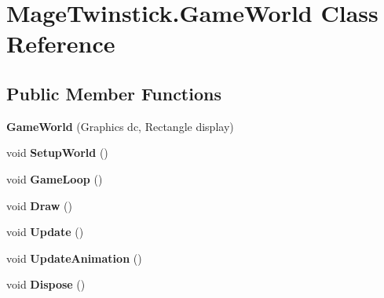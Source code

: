 \hypertarget{class_mage_twinstick_1_1_game_world}{}\section{Mage\+Twinstick.\+Game\+World Class Reference}
\label{class_mage_twinstick_1_1_game_world}
\subsection*{Public Member Functions}
\begin{DoxyCompactItemize}
\item 
\hypertarget{class_mage_twinstick_1_1_game_world_a270f04b1de26513f7893e361303fb129}{}{\bfseries Game\+World} (Graphics dc, Rectangle display)\label{class_mage_twinstick_1_1_game_world_a270f04b1de26513f7893e361303fb129}

\item 
\hypertarget{class_mage_twinstick_1_1_game_world_adb5bdbb96b081dfc7e2ed7a9b2acfa10}{}void {\bfseries Setup\+World} ()\label{class_mage_twinstick_1_1_game_world_adb5bdbb96b081dfc7e2ed7a9b2acfa10}

\item 
\hypertarget{class_mage_twinstick_1_1_game_world_a7a03f6b9f40b1e3e9aed96a614caf5e3}{}void {\bfseries Game\+Loop} ()\label{class_mage_twinstick_1_1_game_world_a7a03f6b9f40b1e3e9aed96a614caf5e3}

\item 
\hypertarget{class_mage_twinstick_1_1_game_world_aad92b4d3c95491f04ac4885d96c15c3c}{}void {\bfseries Draw} ()\label{class_mage_twinstick_1_1_game_world_aad92b4d3c95491f04ac4885d96c15c3c}

\item 
\hypertarget{class_mage_twinstick_1_1_game_world_a3912f8f9ec0acd789eb46e1abcfcf2de}{}void {\bfseries Update} ()\label{class_mage_twinstick_1_1_game_world_a3912f8f9ec0acd789eb46e1abcfcf2de}

\item 
\hypertarget{class_mage_twinstick_1_1_game_world_a6b30c5cbcee01e32068f0d2f117f96fb}{}void {\bfseries Update\+Animation} ()\label{class_mage_twinstick_1_1_game_world_a6b30c5cbcee01e32068f0d2f117f96fb}

\item 
\hypertarget{class_mage_twinstick_1_1_game_world_a80ee847e84f4e16b5f1149dbdce58907}{}void {\bfseries Dispose} ()\label{class_mage_twinstick_1_1_game_world_a80ee847e84f4e16b5f1149dbdce58907}

\end{DoxyCompactItemize}
